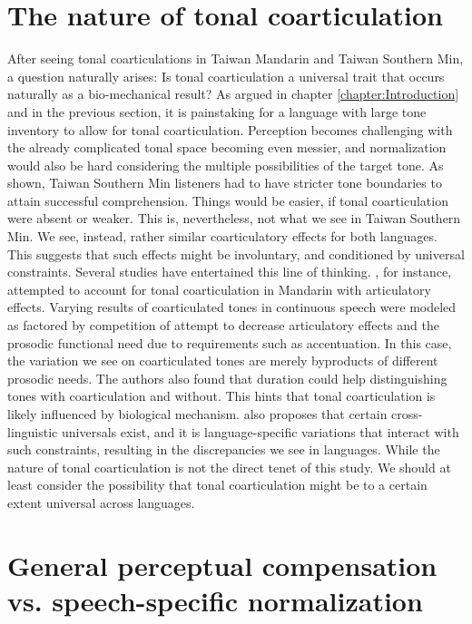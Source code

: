 \documentclass[12pt]{report}
\begin{document}
\begin{CJK}{UTF8}{bsmi}
\section{The nature of tonal coarticulation}
After seeing tonal coarticulations in Taiwan Mandarin and Taiwan Southern Min, a question naturally arises: Is tonal coarticulation a universal trait that occurs naturally as a bio-mechanical result? As argued in chapter \ref{chapter:Introduction} and in the previous section, it is painstaking for a language with large tone inventory to allow for tonal coarticulation. Perception becomes challenging with the already complicated tonal space becoming even messier, and normalization would also be hard considering the multiple possibilities of the target tone. As shown, Taiwan Southern Min listeners had to have stricter tone boundaries to attain successful comprehension. Things would be easier, if tonal coarticulation were absent or weaker. This is, nevertheless, not what we see in Taiwan Southern Min. We see, instead, rather similar coarticulatory effects for both languages. This suggests that such effects might be involuntary, and conditioned by universal constraints. Several studies have entertained this line of thinking. \cite{Haoetal2018}, for instance, attempted to account for tonal coarticulation in Mandarin with articulatory effects. Varying results of coarticulated tones in continuous speech were modeled as factored by competition of attempt to decrease articulatory effects and the prosodic functional need due to requirements such as accentuation. In this case, the variation we see on coarticulated tones are merely byproducts of different prosodic needs. The authors also found that duration could help distinguishing tones with coarticulation and without. This hints that tonal coarticulation is likely influenced by biological mechanism. \cite{Flemming2011} also proposes that certain cross-linguistic universals exist, and it is language-specific variations that interact with such constraints, resulting in the discrepancies we see in languages. While the nature of tonal coarticulation is not the direct tenet of this study. We should at least consider the possibility that tonal coarticulation might be to a certain extent universal across languages.

\section{General perceptual compensation vs. speech-specific normalization}


\end{CJK}
\end{document}
